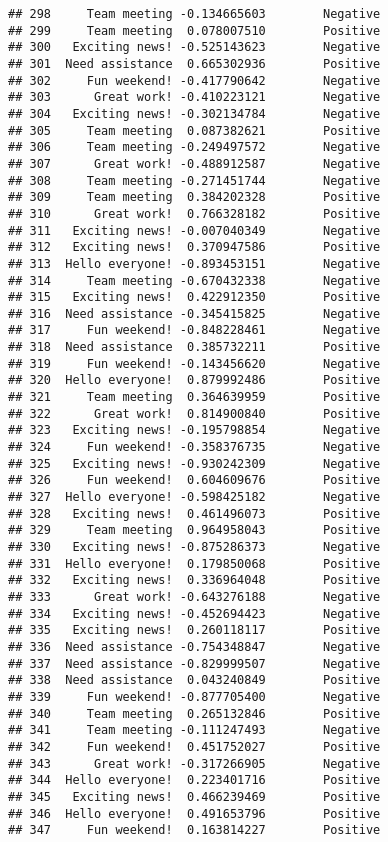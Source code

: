 \documentclass[
]{article}
\begin{document}
\begin{verbatim}
## 298     Team meeting -0.134665603        Negative
## 299     Team meeting  0.078007510        Positive
## 300   Exciting news! -0.525143623        Negative
## 301  Need assistance  0.665302936        Positive
## 302     Fun weekend! -0.417790642        Negative
## 303      Great work! -0.410223121        Negative
## 304   Exciting news! -0.302134784        Negative
## 305     Team meeting  0.087382621        Positive
## 306     Team meeting -0.249497572        Negative
## 307      Great work! -0.488912587        Negative
## 308     Team meeting -0.271451744        Negative
## 309     Team meeting  0.384202328        Positive
## 310      Great work!  0.766328182        Positive
## 311   Exciting news! -0.007040349        Negative
## 312   Exciting news!  0.370947586        Positive
## 313  Hello everyone! -0.893453151        Negative
## 314     Team meeting -0.670432338        Negative
## 315   Exciting news!  0.422912350        Positive
## 316  Need assistance -0.345415825        Negative
## 317     Fun weekend! -0.848228461        Negative
## 318  Need assistance  0.385732211        Positive
## 319     Fun weekend! -0.143456620        Negative
## 320  Hello everyone!  0.879992486        Positive
## 321     Team meeting  0.364639959        Positive
## 322      Great work!  0.814900840        Positive
## 323   Exciting news! -0.195798854        Negative
## 324     Fun weekend! -0.358376735        Negative
## 325   Exciting news! -0.930242309        Negative
## 326     Fun weekend!  0.604609676        Positive
## 327  Hello everyone! -0.598425182        Negative
## 328   Exciting news!  0.461496073        Positive
## 329     Team meeting  0.964958043        Positive
## 330   Exciting news! -0.875286373        Negative
## 331  Hello everyone!  0.179850068        Positive
## 332   Exciting news!  0.336964048        Positive
## 333      Great work! -0.643276188        Negative
## 334   Exciting news! -0.452694423        Negative
## 335   Exciting news!  0.260118117        Positive
## 336  Need assistance -0.754348847        Negative
## 337  Need assistance -0.829999507        Negative
## 338  Need assistance  0.043240849        Positive
## 339     Fun weekend! -0.877705400        Negative
## 340     Team meeting  0.265132846        Positive
## 341     Team meeting -0.111247493        Negative
## 342     Fun weekend!  0.451752027        Positive
## 343      Great work! -0.317266905        Negative
## 344  Hello everyone!  0.223401716        Positive
## 345   Exciting news!  0.466239469        Positive
## 346  Hello everyone!  0.491653796        Positive
## 347     Fun weekend!  0.163814227        Positive

\end{verbatim}
\end{document}

